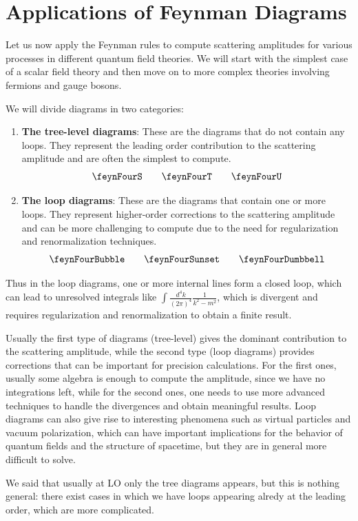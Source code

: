 \section{Applications of Feynman Diagrams}

Let us now apply the Feynman rules to compute scattering amplitudes for various processes in different quantum field theories. We will start with the simplest case of a scalar field theory and then move on to more complex theories involving fermions and gauge bosons.

We will divide diagrams in two categories:
\begin{enumerate}
    \item \textbf{The tree-level diagrams}: These are the diagrams that do not contain any loops. They represent the leading order contribution to the scattering amplitude and are often the simplest to compute.
          \[
              \feynFourS \qquad \feynFourT \qquad \feynFourU
          \]
    \item \textbf{The loop diagrams}: These are the diagrams that contain one or more loops. They represent higher-order corrections to the scattering amplitude and can be more challenging to compute due to the need for regularization and renormalization techniques.
          \[
              \feynFourBubble \qquad \feynFourSunset \qquad \feynFourDumbbell
          \]
\end{enumerate}
Thus in the loop diagrams, one or more internal lines form a closed loop, which can lead to unresolved integrals like \(\int \frac{d^4 k}{(2\pi)^4} \frac{1}{k^2 - m^2}\), which is divergent and requires regularization and renormalization to obtain a finite result.

Usually the first type of diagrams (tree-level) gives the dominant contribution to the scattering amplitude, while the second type (loop diagrams) provides corrections that can be important for precision calculations. For the first ones, usually some algebra is enough to compute the amplitude, since we have no integrations left, while for the second ones, one needs to use more advanced techniques to handle the divergences and obtain meaningful results. Loop diagrams can also give rise to interesting phenomena such as virtual particles and vacuum polarization, which can have important implications for the behavior of quantum fields and the structure of spacetime, but they are in general more difficult to solve.

\begin{remark}
    We said that usually at LO only the tree diagrams appears, but this is nothing general: there exist cases in which we have loops appearing alredy at the leading order, which are more complicated.
\end{remark}

